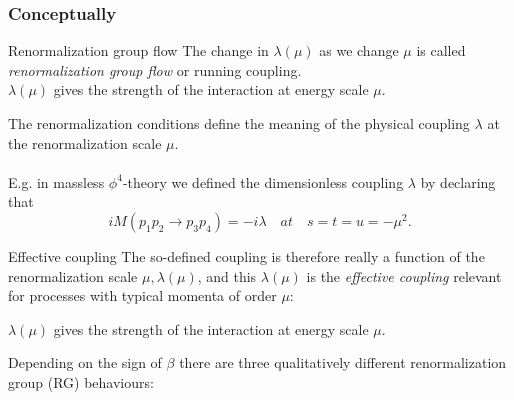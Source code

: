 \subsubsection{Conceptually}
\begin{mybox}{Renormalization group flow}
	The change in $\lambda(\mu)$ as we change $\mu$ is called \emph{renormalization group flow} or running coupling.\\
	$\lambda(\mu)$ gives the strength of the interaction at energy scale $\mu$.
\end{mybox}
The renormalization conditions define the meaning of the physical coupling $\lambda$ at the renormalization scale $\mu$.
\\
\\ E.g. in massless $\phi^4$-theory we defined the dimensionless coupling $\lambda$ by declaring that
\begin{equation}
	i M(p_1 p_2 \rightarrow p_3 p_4) = -i \lambda \quad at \quad s=t=u=-\mu^2.
\end{equation}
\begin{mybox}{Effective coupling}
	The so-defined coupling is therefore really a function of the renormalization scale $\mu, \lambda(\mu)$, and this $\lambda(\mu)$ is the \emph{effective coupling} relevant for processes with typical momenta of order $\mu$:
	\begin{statements}
		$\lambda(\mu)$ gives the strength of the interaction at energy scale $\mu$.
	\end{statements}
\end{mybox}
Depending on the sign of $\beta$ there are three qualitatively different renormalization group (RG) behaviours:
